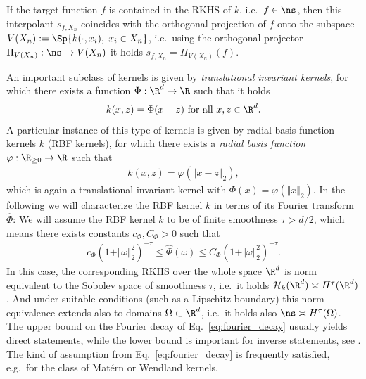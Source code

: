 \documentclass[a4paper, 10pt]{article}
\begin{document}
If the target function $f$ is contained in the RKHS of $k$, 
i.e.\ $f \in \ns$, then this interpolant $s_{f, X_n}$ coincides with the orthogonal projection of $f$ onto the subspace $V(X_n) := \Sp \{ k(\cdot, x_i),\; x_i \in X_n \}$, 
i.e.\ using the orthogonal projector ${\Pi_{V(X_n)}: \ns \rightarrow V(X_n)}$  it holds $s_{f, X_n} = \Pi_{V(X_n)}(f)$.

An important subclass of kernels is given by \textit{translational invariant kernels}, 
for which there exists a function $\Phi: \R^d \rightarrow \R$ such that it holds
\begin{align*}
k(x, z) = \Phi(x - z) ~ \text{for all} ~ x, z \in \R^d.
\end{align*}
A particular instance of this type of kernels is given by radial basis function kernels $k$ (RBF kernels), for which there exists a \textit{radial basis function} $\varphi: \R_{\geq 0} \rightarrow \R$ such that
\begin{align*}
k(x, z) = \varphi(\Vert x - z \Vert_2),
\end{align*}
which is again a translational invariant kernel with $\Phi(x) = \varphi(\Vert x \Vert_2)$.
In the following we will characterize the RBF kernel $k$ in terms of its Fourier transform $\hat{\Phi}$: 
We will assume the RBF kernel $k$ to be of finite smoothness $\tau > d/2$, 
which means there exists constants $c_\Phi, C_\Phi > 0$ such that 
\begin{align}
\label{eq:fourier_decay}
c_\Phi (1+\Vert \omega \Vert_2^2)^{-\tau} \leq \hat{\Phi}(\omega) \leq C_\Phi (1 + \Vert \omega \Vert_2^2)^{-\tau}.
\end{align}
In this case, the corresponding RKHS over the whole space $\R^d$ is norm equivalent to the Sobolev space of smoothness $\tau$, i.e.\ it holds $\mathcal{H}_k(\R^d) \asymp H^\tau(\R^d)$.
And under suitable conditions (such as a Lipschitz boundary) this norm equivalence extends also to domains $\Omega \subset \R^d$, i.e.\ it holds also $\ns \asymp H^\tau(\Omega)$.
The upper bound on the Fourier decay of Eq.~\eqref{eq:fourier_decay} usually yields direct statements, 
while the lower bound is important for inverse statements, see .
The kind of assumption from Eq.~\eqref{eq:fourier_decay} is frequently satisfied, e.g.\ for the class of Matérn or Wendland kernels.  %
\end{document}
